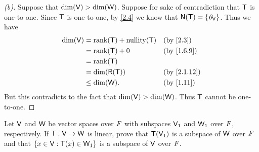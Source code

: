\begin{proof}[(b)]
  Suppose that \(\dim(\mathsf{V}) > \dim(\mathsf{W})\).
  Suppose for sake of contradiction that \(\mathsf{T}\) is one-to-one.
  Since \(\mathsf{T}\) is one-to-one, by \cref{2.4} we know that \(\ns{\T} = \set{\zv_{\V}}\).
  Thus we have
  \begin{align*}
    \dim(\V) & = \rk{\T} + \nt{\T} &  & \by{2.3}    \\
             & = \rk{\T} + 0       &  & \by{1.6.9}  \\
             & = \rk{\T}                            \\
             & = \dim(\rg{\T})     &  & \by{2.1.12} \\
             & \leq \dim(\W).      &  & \by{1.11}
  \end{align*}
  But this contradicts to the fact that \(\dim(\mathsf{V}) > \dim(\mathsf{W})\).
  Thus \(\mathsf{T}\) cannot be one-to-one.
\end{proof}

\setcounter{ex}{19}
\begin{ex}\label{ex:2.1.20}
  Let \(\mathsf{V}\) and \(\mathsf{W}\) be vector spaces over \(\mathit{F}\) with subspaces \(\mathsf{V}_1\) and \(\mathsf{W}_1\) over \(\mathit{F}\), respectively.
  If \(\mathsf{T} : \mathsf{V} \to \mathsf{W}\) is linear, prove that \(\mathsf{T}(\mathsf{V}_1)\) is a subspace of \(\mathsf{W}\) over \(\mathit{F}\) and that \(\left\lbrace x \in \mathsf{V} : \mathsf{T}(x) \in \mathsf{W}_1\right\rbrace\) is a subspace of \(\mathsf{V}\) over \(\mathit{F}\).
\end{ex}

